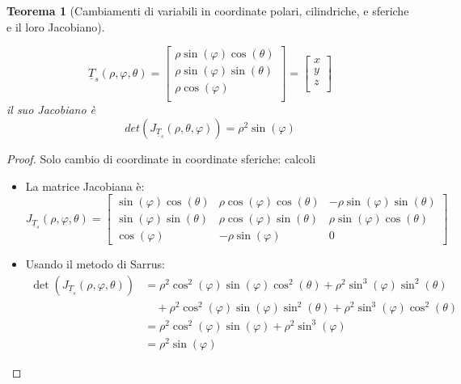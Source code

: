 \documentclass[12pt, a4paper]{article}
\theoremstyle{break}
\newtheorem{theorem}{Teorema} %
\begin{document}
\begin{theorem} [Cambiamenti di variabili in coordinate polari, cilindriche, e
		sferiche e il loro Jacobiano]
\begin{itemize}
\[			      \underline{T}_s(\rho, \varphi, \theta) =
			      \begin{bmatrix}
				      \rho \sin(\varphi) \cos(\theta) \\
				      \rho \sin(\varphi) \sin(\theta) \\
				      \rho \cos(\varphi)              \\
			      \end{bmatrix}
			      =
			      \begin{bmatrix}
				      x \\
				      y \\
				      z \\
			      \end{bmatrix}
		      \]
		      il suo Jacobiano è
		      \[
			      det(J_{\underline{T}_s} (\rho, \theta, \varphi)) = \rho^2
			      \sin(\varphi)
		      \]
	\end{itemize}
\end{theorem}
\begin{proof} Solo cambio di coordinate in coordinate sferiche: calcoli
	\begin{itemize}
		\item La matrice Jacobiana è:
		      \[
			      J_{\underline{T}_s} (\rho, \varphi, \theta) =
			      \begin{bmatrix}
				      \sin(\varphi) \cos(\theta) & \rho \cos(\varphi) \cos(\theta)
				                                 & -\rho \sin(\varphi)
				      \sin(\theta)
				      \\ \sin(\varphi) \sin(\theta)& \rho \cos(\varphi)
				      \sin(\theta)               & \rho \sin(\varphi) \cos(\theta)
				      \\ \cos(\varphi) & -\rho \sin(\varphi)              & 0
			      \end{bmatrix}
		      \]
		\item Usando il metodo di Sarrus:
		      \begin{align*}
			      \det(J_{\underline{T}_s} (\rho, \varphi, \theta)) & =
			      \rho^2 \cos^2(\varphi) \sin(\varphi) \cos^2(\theta) +
			      \rho^2 \sin^3(\varphi) \sin^2(\theta)
			      \\ & \quad + \rho^2 \cos^2(\varphi) \sin(\varphi) \sin^2(\theta)
			      + \rho^2 \sin^3(\varphi) \cos^2(\theta)
			      \\ &= \rho^2 \cos^2(\varphi) \sin(\varphi) +
			      \rho^2 \sin^3(\varphi)
			      \\ &= \rho^2 \sin(\varphi)
		      \end{align*}
	\end{itemize}
\end{proof}
\end{document}
